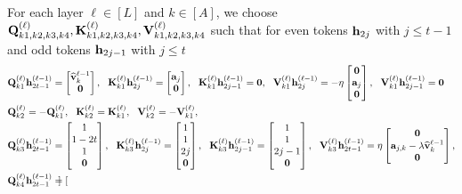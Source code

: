 For each layer $\ell\in[L]$ and $k\in[A]$, we choose 
${\mathbf Q}_{k1,k2,k3,k4}^{(\ell)},{\mathbf K}_{k1,k2,k3,k4}^{(\ell)},{\mathbf V}_{k1,k2,k3,k4}^{(\ell)}$ such that for even tokens ${\mathbf h}_{2j}$ with $j\leq t-1$ and odd tokens ${\mathbf h}_{2j-1}$ with $j\leq t$
\begin{align*}
    &{\mathbf Q}_{k1}^{(\ell)}{\mathbf h}^{(\ell-1)}_{2t-1}=\begin{bmatrix}
        \widehat{{\mathbf v}}_k^{\ell-1}\\{\mathbf 0}
    \end{bmatrix},~~ {\mathbf K}_{k1}^{(\ell)}{\mathbf h}^{(\ell-1)}_{2j}=\begin{bmatrix}
        {\mathbf a}_{j}\\{\mathbf 0}
\end{bmatrix},~~{\mathbf K}_{k1}^{(\ell)}{\mathbf h}^{(\ell-1)}_{2j-1}={\mathbf 0},~~ {\mathbf V}_{k1}^{(\ell)}{\mathbf h}^{(\ell-1)}_{2j}=-\eta\begin{bmatrix}
        {\mathbf 0}\\ {\mathbf a}_j \\ {\mathbf 0}
    \end{bmatrix},~~{\mathbf V}_{k1}^{(\ell)}{\mathbf h}^{(\ell-1)}_{2j-1}={\mathbf 0}\\
    &
    {\mathbf Q}_{k2}^{(\ell)}=-{\mathbf Q}_{k1}^{(\ell)},~~ {\mathbf K}_{k2}^{(\ell)}={\mathbf K}_{k1}^{(\ell)},~~  {\mathbf V}_{k2}^{(\ell)}=-{\mathbf V}_{k1}^{(\ell)},\\
     &
     {\mathbf Q}_{k3}^{(\ell)}{\mathbf h}^{(\ell-1)}_{2t-1}=\begin{bmatrix}
         1\\1-2t\\ 1\\{\mathbf 0}
    \end{bmatrix},~~ {\mathbf K}_{k3}^{(\ell)}{\mathbf h}^{(\ell-1)}_{2j}=\begin{bmatrix}
        1\\ 1 \\2j\\{\mathbf 0}
    \end{bmatrix},~~ 
    {\mathbf K}_{k3}^{(\ell)}{\mathbf h}^{(\ell-1)}_{2j-1}=\begin{bmatrix}
        1\\ 1 \\2j-1\\{\mathbf 0}
    \end{bmatrix},~~ {\mathbf V}_{k3}^{(\ell)}{\mathbf h}^{(\ell-1)}_{2t-1}=\eta\begin{bmatrix}
        {\mathbf 0}\\ {\mathbf a}_{j,k}-\lambda\widehat{{\mathbf v}}_k^{\ell-1}\\ {\mathbf 0}
    \end{bmatrix},\\
     &
     {\mathbf Q}_{k4}^{(\ell)}{\mathbf h}^{(\ell-1)}_{2t-1}=\begin{bmatrix}

\end{bmatrix}
\end{align*}
